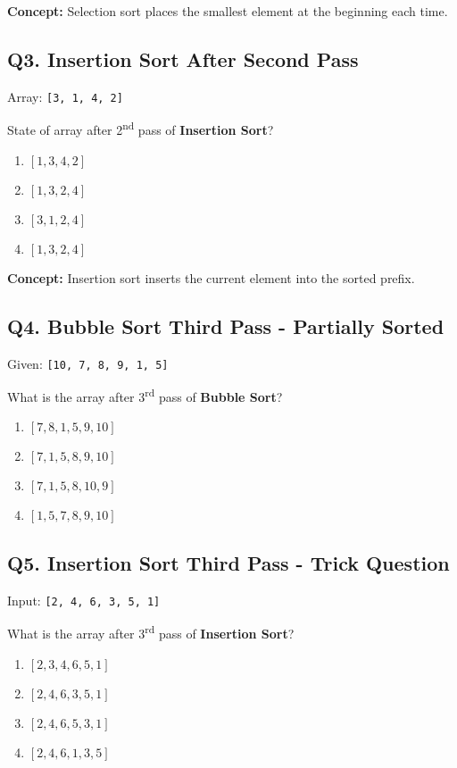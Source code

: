 \textbf{Concept:} Selection sort places the smallest element at the beginning each time.

\subsection*{Q3. Insertion Sort After Second Pass}
Array: \texttt{[3, 1, 4, 2]}

State of array after 2\textsuperscript{nd} pass of \textbf{Insertion Sort}?

\begin{enumerate}[label=(\alph*)]
    \item $[1, 3, 4, 2]$
    \item $[1, 3, 2, 4]$ 
    \item $[3, 1, 2, 4]$ 
    \item $[1, 3, 2, 4]$
\end{enumerate}

\textbf{Concept:} Insertion sort inserts the current element into the sorted prefix.


\subsection*{Q4. Bubble Sort Third Pass - Partially Sorted}
Given: \texttt{[10, 7, 8, 9, 1, 5]}

What is the array after 3\textsuperscript{rd} pass of \textbf{Bubble Sort}?

\begin{enumerate}[label=(\alph*)]
    \item $[7, 8, 1, 5, 9, 10]$ 
    \item $[7, 1, 5, 8, 9, 10]$ 
    \item $[7, 1, 5, 8, 10, 9]$ 
    \item $[1, 5, 7, 8, 9, 10]$
\end{enumerate}


\subsection*{Q5. Insertion Sort Third Pass - Trick Question}
Input: \texttt{[2, 4, 6, 3, 5, 1]}

What is the array after 3\textsuperscript{rd} pass of \textbf{Insertion Sort}?

\begin{enumerate}[label=(\alph*)]
    \item $[2, 3, 4, 6, 5, 1]$ 
    \item $[2, 4, 6, 3, 5, 1]$ 
    \item $[2, 4, 6, 5, 3, 1]$ 
    \item $[2, 4, 6, 1, 3, 5]$
\end{enumerate}

